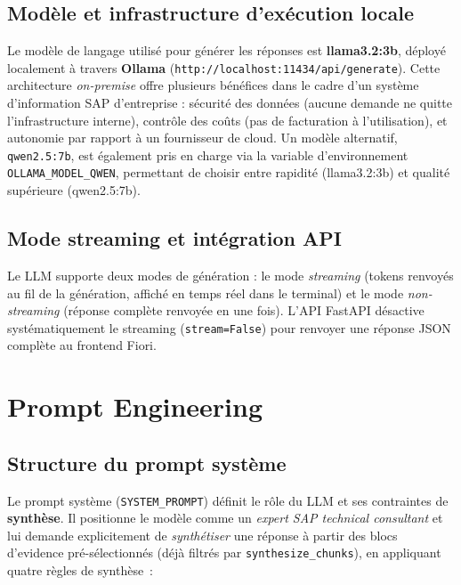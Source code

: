 \subsection{Modèle et infrastructure d'exécution locale}
Le modèle de langage utilisé pour générer les réponses est \textbf{llama3.2:3b}, déployé localement à travers \textbf{Ollama} (\texttt{http://localhost:11434/api/generate}). Cette architecture \textit{on-premise} offre plusieurs bénéfices dans le cadre d'un système d'information SAP d'entreprise : sécurité des données (aucune demande ne quitte l'infrastructure interne), contrôle des coûts (pas de facturation à l'utilisation), et autonomie par rapport à un fournisseur de cloud. Un modèle alternatif, \texttt{qwen2.5:7b}, est également pris en charge via la variable d'environnement \texttt{OLLAMA\_MODEL\_QWEN}, permettant de choisir entre rapidité (llama3.2:3b) et qualité supérieure (qwen2.5:7b).

\subsection{Mode streaming et intégration API}

Le LLM supporte deux modes de génération : le mode \textit{streaming} (tokens renvoyés au fil de la génération, affiché en temps réel dans le terminal) et le mode \textit{non-streaming} (réponse complète renvoyée en une fois). L'API FastAPI désactive systématiquement le streaming (\texttt{stream=False}) pour renvoyer une réponse JSON complète au frontend Fiori.

\section{Prompt Engineering}

\subsection{Structure du prompt système}

Le prompt système (\texttt{SYSTEM\_PROMPT}) définit le rôle du LLM et ses contraintes de \textbf{synthèse}. Il positionne le modèle comme un \textit{expert SAP technical consultant} et lui demande explicitement de \textit{synthétiser} une réponse à partir des blocs d'evidence pré-sélectionnés (déjà filtrés par \texttt{synthesize\_chunks}), en appliquant quatre règles de synthèse~:


